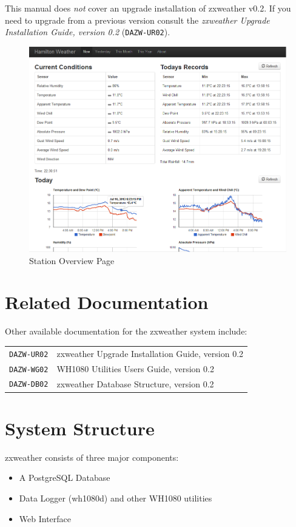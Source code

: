 \documentclass[a4paper,10pt,draft]{book}
\begin{document}
This manual does \emph{not} cover an upgrade installation of zxweather v0.2. If you need to upgrade from a previous version consult the \emph{zxweather Upgrade Installation Guide, version 0.2} (\verb|DAZW-UR02|).

\begin {figure}[!ht]
 \centering
 \includegraphics[scale=0.574]{images/stat_overview}
 \caption{Station Overview Page}
 \label{img_station_overview}
\end {figure}

\section{Related Documentation}
Other available documentation for the zxweather system include:

\begin{tabular}{l l}
\verb|DAZW-UR02| & zxweather Upgrade Installation Guide, version 0.2\\
\verb|DAZW-WG02| & WH1080 Utilities Users Guide, version 0.2 \\
\verb|DAZW-DB02| & zxweather Database Structure, version 0.2 \\
\end{tabular}

\section{System Structure}
zxweather consists of three major components:
\begin{itemize}
\item A PostgreSQL Database
\item Data Logger (wh1080d) and other WH1080 utilities
\item Web Interface
\end{itemize}
\end{document}
